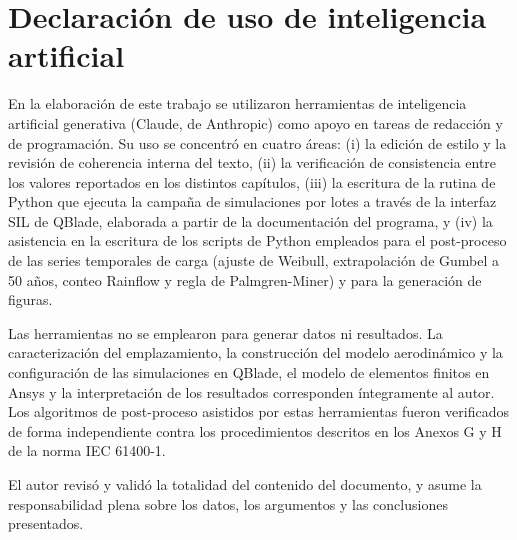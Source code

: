 \chapter*{Declaración de uso de inteligencia artificial}
\label{sec:declaracion_ia}

En la elaboración de este trabajo se utilizaron herramientas de inteligencia artificial generativa (Claude, de Anthropic) como apoyo en tareas de redacción y de programación. Su uso se concentró en cuatro áreas: (i) la edición de estilo y la revisión de coherencia interna del texto, (ii) la verificación de consistencia entre los valores reportados en los distintos capítulos, (iii) la escritura de la rutina de Python que ejecuta la campaña de simulaciones por lotes a través de la interfaz SIL de QBlade, elaborada a partir de la documentación del programa, y (iv) la asistencia en la escritura de los scripts de Python empleados para el post-proceso de las series temporales de carga (ajuste de Weibull, extrapolación de Gumbel a 50 años, conteo Rainflow y regla de Palmgren-Miner) y para la generación de figuras.

Las herramientas no se emplearon para generar datos ni resultados. La caracterización del emplazamiento, la construcción del modelo aerodinámico y la configuración de las simulaciones en QBlade, el modelo de elementos finitos en Ansys y la interpretación de los resultados corresponden íntegramente al autor. Los algoritmos de post-proceso asistidos por estas herramientas fueron verificados de forma independiente contra los procedimientos descritos en los Anexos G y H de la norma IEC 61400-1.

El autor revisó y validó la totalidad del contenido del documento, y asume la responsabilidad plena sobre los datos, los argumentos y las conclusiones presentados.
